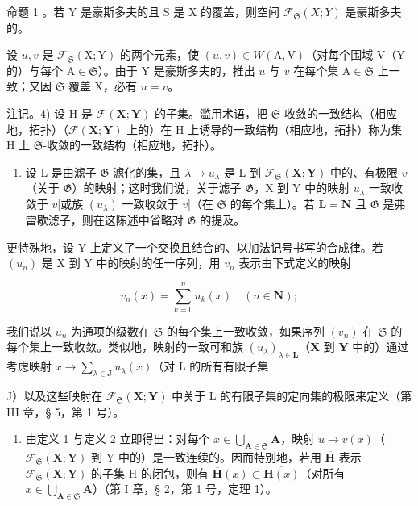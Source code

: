 命题 1 。若 Y 是豪斯多夫的且 S 是 X 的覆盖，则空间 \(\mathcal{F}_{\mathfrak{S}}(X;Y)\) 是豪斯多夫的。

设 \(u, v\) 是 \(\mathcal{F}_{\mathfrak{S}}(\mathrm{X}; \mathrm{Y})\) 的两个元素，使 \((u, v) \in W(\mathrm{A}, \mathrm{V})\)（对每个围域 \(\mathrm{V}\)（\(\mathrm{Y}\) 的）与每个 \(\mathrm{A} \in \mathfrak{S}\)）。由于 \(\mathrm{Y}\) 是豪斯多夫的，推出 \(u\) 与 \(v\) 在每个集 \(\mathrm{A} \in \mathfrak{S}\) 上一致；又因 \(\mathfrak{S}\) 覆盖 \(\mathrm{X}\)，必有 \(u = v\)。

注记。4) 设 H 是 \(\mathcal{F}(\mathbf{X};\mathbf{Y})\) 的子集。滥用术语，把 \(\mathfrak{S}\)-收敛的一致结构（相应地，拓扑）（\(\mathcal{F}(\mathbf{X};\mathbf{Y})\) 上的）在 H 上诱导的一致结构（相应地，拓扑）称为集 H 上 \(\mathfrak{S}\)-收敛的一致结构（相应地，拓扑）。

\begin{enumerate}
\def\labelenumi{\arabic{enumi})}
\setcounter{enumi}{4}
\tightlist
\item
  设 L 是由滤子 \(\mathfrak{G}\) 滤化的集，且 \(\lambda \to u_{\lambda}\) 是 L 到 \(\mathcal{F}_{\mathfrak{S}}(\mathbf{X};\mathbf{Y})\) 中的、有极限 \(v\)（关于 \(\mathfrak{G}\)）的映射；这时我们说，关于滤子 \(\mathfrak{G}\)，X 到 Y 中的映射 \(u_{\lambda}\) 一致收敛于 \(v\){[}或族 \((u_{\lambda})\) 一致收敛于 \(v\){]}（在 \(\mathfrak{S}\) 的每个集上）。若 \(\mathbf{L} = \mathbf{N}\) 且 \(\mathfrak{G}\) 是弗雷歇滤子，则在这陈述中省略对 \(\mathfrak{G}\) 的提及。
\end{enumerate}

更特殊地，设 Y 上定义了一个交换且结合的、以加法记号书写的合成律。若 \((u_{n})\) 是 X 到 Y 中的映射的任一序列，用 \(v_{n}\) 表示由下式定义的映射

\[
v _ {n} (x) = \sum_ {k = 0} ^ {n} u _ {k} (x) \quad (n \in \mathbf {N});
\]

我们说以 \(u_n\) 为通项的级数在 \(\mathfrak{S}\) 的每个集上一致收敛，如果序列 \((v_n)\) 在 \(\mathfrak{S}\) 的每个集上一致收敛。类似地，映射的一致可和族 \((u_\lambda)_{\lambda \in \mathbf{L}}\)（\(\mathbf{X}\) 到 \(\mathbf{Y}\) 中的）通过考虑映射 \(x \to \sum_{\lambda \in \mathbf{J}} u_\lambda(x)\)（对 L 的所有有限子集

J）以及这些映射在 \(\mathcal{F}_{\mathfrak{S}}(\mathbf{X};\mathbf{Y})\) 中关于 L 的有限子集的定向集的极限来定义（第 III 章，§ 5，第 1 号）。

\begin{enumerate}
\def\labelenumi{\arabic{enumi})}
\setcounter{enumi}{5}
\tightlist
\item
  由定义 1 与定义 2 立即得出：对每个 \(x \in \bigcup_{\mathbf{A} \in \mathfrak{S}} \mathbf{A}\)，映射 \(u \to v(x)\)（\(\mathcal{F}_{\mathfrak{S}}(\mathbf{X}; \mathbf{Y})\) 到 Y 中的）是一致连续的。因而特别地，若用 \(\overline{\mathbf{H}}\) 表示 \(\mathcal{F}_{\mathfrak{S}}(\mathbf{X}; \mathbf{Y})\) 的子集 H 的闭包，则有 \(\overline{\mathbf{H}}(x) \subset \overline{\mathbf{H}(x)}\)（对所有 \(x \in \bigcup_{\mathbf{A} \in \mathfrak{S}} \mathbf{A}\)）（第 I 章，§ 2，第 1 号，定理 1）。
\end{enumerate}

